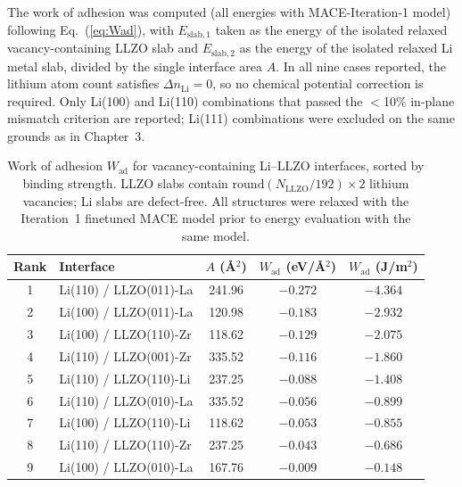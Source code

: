 \documentclass[12pt,a4paper,oneside]{book}
\newcommand{\eqnref}[1]{Eq.~(\ref{#1})}
\begin{document}
The work of adhesion was computed (all energies with MACE-Iteration-1 model) following \eqnref{eq:Wad}, with $E_{\mathrm{slab,1}}$
taken as the energy of the isolated relaxed vacancy-containing LLZO slab and
$E_{\mathrm{slab,2}}$ as the energy of the isolated relaxed Li metal slab, divided
by the single interface area $A$. In all nine cases reported, the lithium atom count
satisfies $\Delta n_{\mathrm{Li}} = 0$, so no chemical potential correction is
required. Only Li(100) and Li(110) combinations that passed the $<$10\% in-plane
mismatch criterion are reported; Li(111) combinations were excluded on the same
grounds as in Chapter~3.

\begin{table}[htbp]
\centering
\caption{Work of adhesion $W_{\mathrm{ad}}$ for vacancy-containing Li--LLZO
interfaces, sorted by binding strength. LLZO slabs contain
$\mathrm{round}(N_{\mathrm{LLZO}}/192) \times 2$ lithium vacancies; Li slabs are
defect-free. All structures were relaxed with the Iteration~1 finetuned MACE
model prior to energy evaluation with the same model.}
\label{tab:wad_vacancy}
\begin{tabular}{clccc}
\hline
Rank & Interface & $A$ (\AA$^2$) & $W_{\mathrm{ad}}$ (eV/\AA$^2$) & $W_{\mathrm{ad}}$ (J/m$^2$) \\
\hline
1 & Li(110) / LLZO(011)-La & 241.96 & $-0.272$ & $-4.364$ \\
2 & Li(100) / LLZO(011)-La & 120.98 & $-0.183$ & $-2.932$ \\
3 & Li(100) / LLZO(110)-Zr & 118.62 & $-0.129$ & $-2.075$ \\
4 & Li(110) / LLZO(001)-Zr & 335.52 & $-0.116$ & $-1.860$ \\
5 & Li(110) / LLZO(110)-Li & 237.25 & $-0.088$ & $-1.408$ \\
6 & Li(110) / LLZO(010)-La & 335.52 & $-0.056$ & $-0.899$ \\
7 & Li(100) / LLZO(110)-Li & 118.62 & $-0.053$ & $-0.855$ \\
8 & Li(110) / LLZO(110)-Zr & 237.25 & $-0.043$ & $-0.686$ \\
9 & Li(100) / LLZO(010)-La & 167.76 & $-0.009$ & $-0.148$ \\
\hline
\end{tabular}
\end{table}
\end{document}
